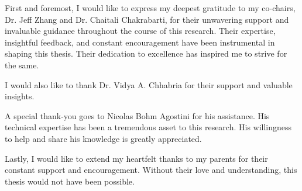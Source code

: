 \begin{acknowledgements}
First and foremost, I would like to express my deepest gratitude to my co-chairs, Dr. Jeff Zhang and Dr. Chaitali Chakrabarti, for their unwavering support and invaluable guidance throughout the course of this research. Their expertise, insightful feedback, and constant encouragement have been instrumental in shaping this thesis. Their dedication to excellence has inspired me to strive for the same.

I would also like to thank Dr. Vidya A. Chhabria for their support and valuable insights.

A special thank-you goes to Nicolas Bohm Agostini for his assistance. His technical expertise has been a tremendous asset to this research. His willingness to help and share his knowledge is greatly appreciated.

Lastly, I would like to extend my heartfelt thanks to my parents for their constant support and encouragement. Without their love and understanding, this thesis would not have been possible.
\end{acknowledgements}
